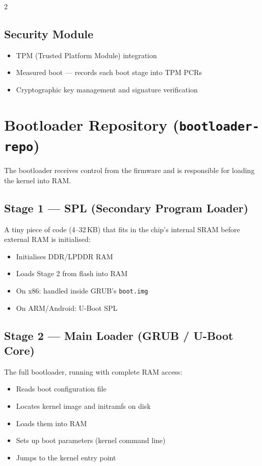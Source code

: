2\documentclass[11pt,a4paper]{article}
\begin{document}
\subsection{Security Module}
\begin{itemize}[noitemsep]
  \item TPM (Trusted Platform Module) integration
  \item Measured boot --- records each boot stage into TPM PCRs
  \item Cryptographic key management and signature verification
\end{itemize}

\section{Bootloader Repository (\texttt{bootloader-repo})}

The bootloader receives control from the firmware and is responsible for loading the kernel into RAM.

\subsection{Stage 1 --- SPL (Secondary Program Loader)}
A tiny piece of code (4--32\,KB) that fits in the chip's internal SRAM before external RAM is initialised:
\begin{itemize}[noitemsep]
  \item Initialises DDR/LPDDR RAM
  \item Loads Stage 2 from flash into RAM
  \item On x86: handled inside GRUB's \texttt{boot.img}
  \item On ARM/Android: U-Boot SPL
\end{itemize}

\subsection{Stage 2 --- Main Loader (GRUB / U-Boot Core)}
The full bootloader, running with complete RAM access:
\begin{itemize}[noitemsep]
  \item Reads boot configuration file
  \item Locates kernel image and initramfs on disk
  \item Loads them into RAM
  \item Sets up boot parameters (kernel command line)
  \item Jumps to the kernel entry point
\end{itemize}
\end{document}

